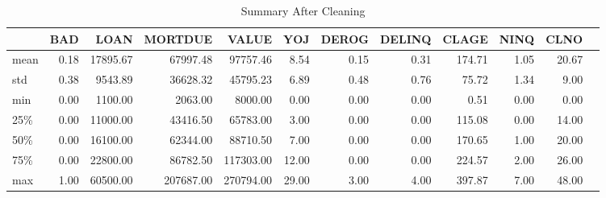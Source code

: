 \begin{appendices}
\begin{landscape}
\begin{table}[ht]
	\centering
	\renewcommand{\arraystretch}{2}
	\begin{tabular}{lrrrrrrrrrrr}
	\toprule
	{} &      BAD &      LOAN &    MORTDUE &      VALUE &      YOJ &    DEROG &   DELINQ &    CLAGE &     NINQ &     CLNO \\
	\midrule
	mean  &     0.18 &  17895.67 &   67997.48 &   97757.46 &     8.54 &     0.15 &     0.31 &   174.71 &     1.05 &    20.67 \\
	std   &     0.38 &   9543.89 &   36628.32 &   45795.23 &     6.89 &     0.48 &     0.76 &    75.72 &     1.34 &     9.00 \\
	min   &     0.00 &   1100.00 &    2063.00 &    8000.00 &     0.00 &     0.00 &     0.00 &     0.51 &     0.00 &     0.00 \\
	25\%   &     0.00 &  11000.00 &   43416.50 &   65783.00 &     3.00 &     0.00 &     0.00 &   115.08 &     0.00 &    14.00 \\
	50\%   &     0.00 &  16100.00 &   62344.00 &   88710.50 &     7.00 &     0.00 &     0.00 &   170.65 &     1.00 &    20.00 \\
	75\%   &     0.00 &  22800.00 &   86782.50 &  117303.00 &    12.00 &     0.00 &     0.00 &   224.57 &     2.00 &    26.00 \\
	max   &     1.00 &  60500.00 &  207687.00 &  270794.00 &    29.00 &     3.00 &     4.00 &   397.87 &     7.00 &    48.00 \\
	\bottomrule
	\end{tabular}
	\caption{Summary After Cleaning \label{SUM_AFT_TBL}}
\end{table}
\end{landscape}


\end{appendices}
